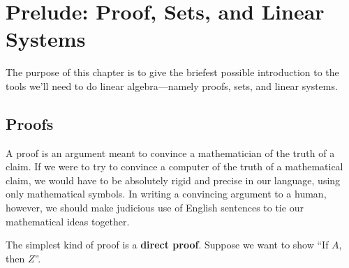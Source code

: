 \chapter{Prelude:  Proof, Sets, and Linear Systems}

The purpose of this chapter is to give the briefest possible introduction to the tools we'll need to do linear algebra---namely proofs, sets, and linear systems.

\section{Proofs}

A proof is an argument meant to convince a mathematician of the truth of a claim. If we were to try to convince a computer of the truth of a mathematical claim, we would have to be absolutely rigid and precise in our language, using only mathematical symbols.  In writing a convincing argument to a human, however, we should make judicious use of English sentences to tie our mathematical ideas together. 

The simplest kind of proof is a \textbf{direct proof}. Suppose we want to show ``If $A$, then $Z$''. 

